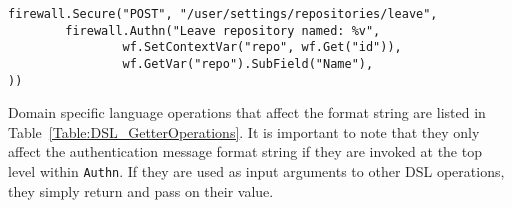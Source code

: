 \begin{lstlisting}
firewall.Secure("POST", "/user/settings/repositories/leave", 
        firewall.Authn("Leave repository named: %v",
                wf.SetContextVar("repo", wf.Get("id")),
                wf.GetVar("repo").SubField("Name"),
))
\end{lstlisting}

Domain specific language operations that affect the format string are listed in Table~\ref{Table:DSL_GetterOperations}. It is important to note that they only affect the authentication message format string if they are invoked at the top level within \lstinline{Authn}. If they are used as input arguments to other DSL operations, they simply return and pass on their value.



